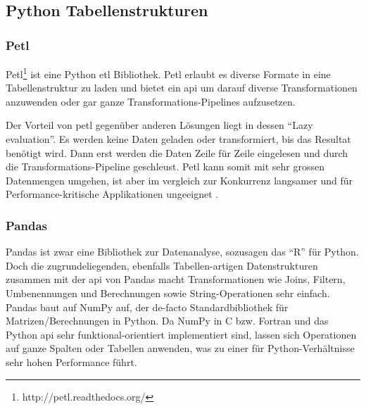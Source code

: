 \subsection{Python Tabellenstrukturen}

\subsubsection{Petl}
Petl\footnote{http://petl.readthedocs.org/} ist eine Python \acs{etl} Bibliothek. Petl erlaubt es diverse Formate in eine Tabellenstruktur zu laden und bietet ein \acs{api} um darauf diverse Transformationen anzuwenden oder gar ganze Transformations-Pipelines aufzusetzen.

Der Vorteil von petl gegenüber anderen Lösungen liegt in dessen ``Lazy evaluation''. Es werden keine Daten geladen oder transformiert, bis das Resultat benötigt wird. Dann erst werden die Daten Zeile für Zeile eingelesen und durch die Transformations-Pipeline geschleust. Petl kann somit mit sehr grossen Datenmengen umgehen, ist aber im vergleich zur Konkurrenz langsamer und für Performance-kritische Applikationen ungeeignet \cite[Intro $\to$ Design goals]{petl}.


\subsubsection{Pandas}
Pandas ist zwar eine Bibliothek zur Datenanalyse, sozusagen das ``R'' für Python. Doch die zugrundeliegenden, ebenfalls Tabellen-artigen Datenstrukturen zusammen mit der \acs{api} von Pandas macht Transformationen wie Joins, Filtern, Umbenennungen und Berechnungen sowie String-Operationen sehr einfach. Pandas baut auf NumPy auf, der de-facto Standardbibliothek für Matrizen/Berechnungen in Python. Da NumPy in C bzw. Fortran und das Python \acs{api} sehr funktional-orientiert implementiert sind, lassen sich Operationen auf ganze Spalten oder Tabellen anwenden, was zu einer für Python-Verhältnisse sehr hohen Performance führt.


